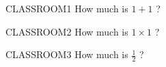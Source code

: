  {\begin{question}{CLASSROOM1}
 How much is $1+1$ ?
 \AMCBoxedAnswers\begin{choices}
 \end{choices}\end{question}
}
 

 {\begin{question}{CLASSROOM2}
 How much is $1 \times 1$ ?
 \AMCBoxedAnswers\begin{choices}
 \end{choices}\end{question}
}
 

 {\begin{question}{CLASSROOM3}
 How much is $\frac{1}{2}$ ?
 \AMCBoxedAnswers\begin{choices}
  \end{choices}\end{question}
}
 


